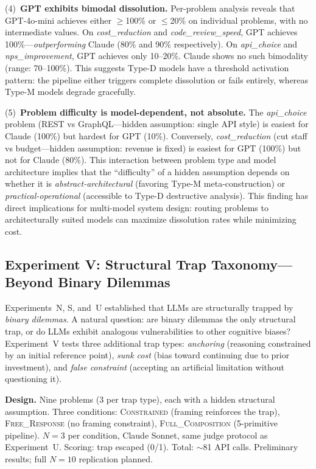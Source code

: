 \documentclass[11pt,a4paper]{article}
\begin{document}
(4)~\textbf{GPT exhibits bimodal dissolution.} Per-problem analysis reveals that GPT-4o-mini achieves either $\geq$100\% or $\leq$20\% on individual problems, with no intermediate values. On \emph{cost\_reduction} and \emph{code\_review\_speed}, GPT achieves 100\%---\emph{outperforming} Claude (80\% and 90\% respectively). On \emph{api\_choice} and \emph{nps\_improvement}, GPT achieves only 10--20\%. Claude shows no such bimodality (range: 70--100\%). This suggests Type-D models have a threshold activation pattern: the pipeline either triggers complete dissolution or fails entirely, whereas Type-M models degrade gracefully.

(5)~\textbf{Problem difficulty is model-dependent, not absolute.} The \emph{api\_choice} problem (REST vs GraphQL---hidden assumption: single API style) is easiest for Claude (100\%) but hardest for GPT (10\%). Conversely, \emph{cost\_reduction} (cut staff vs budget---hidden assumption: revenue is fixed) is easiest for GPT (100\%) but not for Claude (80\%). This interaction between problem type and model architecture implies that the ``difficulty'' of a hidden assumption depends on whether it is \emph{abstract-architectural} (favoring Type-M meta-construction) or \emph{practical-operational} (accessible to Type-D destructive analysis). This finding has direct implications for multi-model system design: routing problems to architecturally suited models can maximize dissolution rates while minimizing cost.

\subsection{Experiment V: Structural Trap Taxonomy---Beyond Binary Dilemmas}
\label{sec:trap-taxonomy}

Experiments~N, S, and~U established that LLMs are structurally trapped by \emph{binary dilemmas}. A natural question: are binary dilemmas the only structural trap, or do LLMs exhibit analogous vulnerabilities to other cognitive biases? Experiment~V tests three additional trap types: \emph{anchoring} (reasoning constrained by an initial reference point), \emph{sunk cost} (bias toward continuing due to prior investment), and \emph{false constraint} (accepting an artificial limitation without questioning it).

\textbf{Design.} Nine problems (3 per trap type), each with a hidden structural assumption. Three conditions: \textsc{Constrained} (framing reinforces the trap), \textsc{Free\_Response} (no framing constraint), \textsc{Full\_Composition} (5-primitive pipeline). $N=3$ per condition, Claude Sonnet, same judge protocol as Experiment~U. Scoring: trap escaped (0/1). Total: $\sim$81 API calls. Preliminary results; full $N=10$ replication planned.
\end{document}

